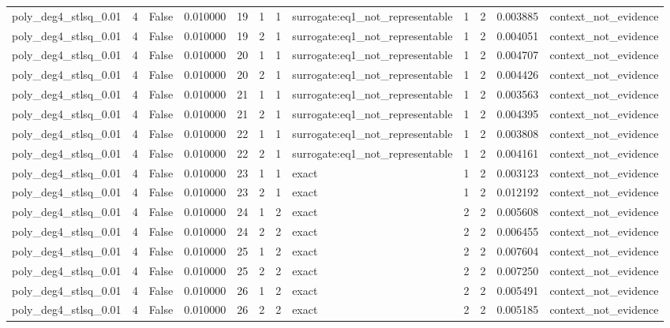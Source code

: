 \begin{tabular}{lrrrrrrlrrrl}
poly\_deg4\_stlsq\_0.01 & 4 & False & 0.010000 & 19 & 1 & 1 & surrogate:eq1\_not\_representable & 1 & 2 & 0.003885 & context\_not\_evidence \\
poly\_deg4\_stlsq\_0.01 & 4 & False & 0.010000 & 19 & 2 & 1 & surrogate:eq1\_not\_representable & 1 & 2 & 0.004051 & context\_not\_evidence \\
poly\_deg4\_stlsq\_0.01 & 4 & False & 0.010000 & 20 & 1 & 1 & surrogate:eq1\_not\_representable & 1 & 2 & 0.004707 & context\_not\_evidence \\
poly\_deg4\_stlsq\_0.01 & 4 & False & 0.010000 & 20 & 2 & 1 & surrogate:eq1\_not\_representable & 1 & 2 & 0.004426 & context\_not\_evidence \\
poly\_deg4\_stlsq\_0.01 & 4 & False & 0.010000 & 21 & 1 & 1 & surrogate:eq1\_not\_representable & 1 & 2 & 0.003563 & context\_not\_evidence \\
poly\_deg4\_stlsq\_0.01 & 4 & False & 0.010000 & 21 & 2 & 1 & surrogate:eq1\_not\_representable & 1 & 2 & 0.004395 & context\_not\_evidence \\
poly\_deg4\_stlsq\_0.01 & 4 & False & 0.010000 & 22 & 1 & 1 & surrogate:eq1\_not\_representable & 1 & 2 & 0.003808 & context\_not\_evidence \\
poly\_deg4\_stlsq\_0.01 & 4 & False & 0.010000 & 22 & 2 & 1 & surrogate:eq1\_not\_representable & 1 & 2 & 0.004161 & context\_not\_evidence \\
poly\_deg4\_stlsq\_0.01 & 4 & False & 0.010000 & 23 & 1 & 1 & exact & 1 & 2 & 0.003123 & context\_not\_evidence \\
poly\_deg4\_stlsq\_0.01 & 4 & False & 0.010000 & 23 & 2 & 1 & exact & 1 & 2 & 0.012192 & context\_not\_evidence \\
poly\_deg4\_stlsq\_0.01 & 4 & False & 0.010000 & 24 & 1 & 2 & exact & 2 & 2 & 0.005608 & context\_not\_evidence \\
poly\_deg4\_stlsq\_0.01 & 4 & False & 0.010000 & 24 & 2 & 2 & exact & 2 & 2 & 0.006455 & context\_not\_evidence \\
poly\_deg4\_stlsq\_0.01 & 4 & False & 0.010000 & 25 & 1 & 2 & exact & 2 & 2 & 0.007604 & context\_not\_evidence \\
poly\_deg4\_stlsq\_0.01 & 4 & False & 0.010000 & 25 & 2 & 2 & exact & 2 & 2 & 0.007250 & context\_not\_evidence \\
poly\_deg4\_stlsq\_0.01 & 4 & False & 0.010000 & 26 & 1 & 2 & exact & 2 & 2 & 0.005491 & context\_not\_evidence \\
poly\_deg4\_stlsq\_0.01 & 4 & False & 0.010000 & 26 & 2 & 2 & exact & 2 & 2 & 0.005185 & context\_not\_evidence \\

\end{tabular}
